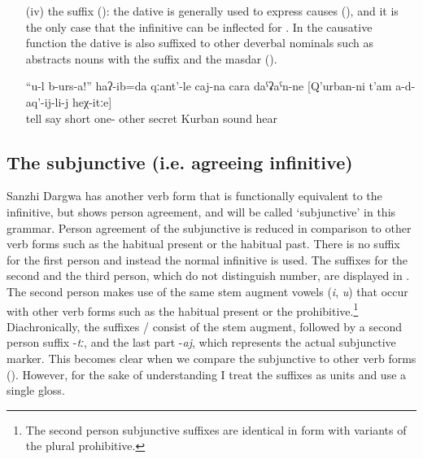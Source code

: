 \begin{enumerate}
	\item[(iv)]	the suffix  (): the dative is generally used to express causes (), and it is the only case that the infinitive can be inflected for . In the causative function the dative is also suffixed to other deverbal nominals such as abstracts nouns with the suffix  and the masdar ().
	\begin{exe}
		\ex	\label{ex:‎‎You tell him, I said silently like this, such that Kurban cannot hear it}
		\gll	``u-l	b-urs-a!''		haʔ-ib=da	qːant'-le	caj-na	cara	daˁʡaˁn-ne		[Q'urban-ni	t'am	a-d-aq'-ij-li-j		heχ-itːe]\\
				tell	say		short	one-	other	secret		Kurban	sound	hear		\\
		\glt	{}
	\end{exe}


\end{enumerate}



\subsection{The subjunctive (i.e. agreeing infinitive)}
\label{ssec:The subjunctive (agreeing infinitive)}

Sanzhi Dargwa has another verb form that is functionally equivalent to the infinitive, but shows person agreement, and will be called `subjunctive' in this grammar. Person agreement of the subjunctive is reduced in comparison to other verb forms such as the habitual present or the habitual past. There is no suffix for the first person and instead the normal infinitive is used. The suffixes for the second and the third person, which do not distinguish number, are displayed in . The second person makes use of the same stem augment vowels (\textit{i}, \textit{u}) that occur with other verb forms such as the habitual present or the prohibitive.\footnote{The second person subjunctive suffixes are identical in form with variants of the plural prohibitive.} Diachronically, the suffixes \slash{} consist of the stem augment, followed by a second person suffix -\textit{tː}, and the last part -\textit{aj}, which represents the actual subjunctive marker. This becomes clear when we compare the subjunctive to other verb forms (). However, for the sake of understanding I treat the suffixes as units and use a single gloss.

